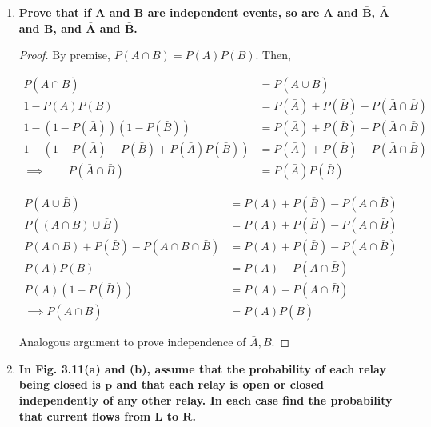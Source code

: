 \documentclass[10pt, oneside]{article}   	%
\theoremstyle{definition}
\begin{document}
\begin{enumerate}[label=3.\arabic*]
\item  \begin{tcolorbox}[
  colback=Cerulean!5!white,
  colframe=Cerulean!75!black]
\textbf{Prove that if $\bm{A}$ and $\bm{B}$ are independent events, so are $\bm{A}$ and $\bm{\bar{B}}$, $\bm{\bar{A}}$ and $\bm{B}$, and $\bm{\bar{A}}$ and $\bm{\bar{B}}$.}
\end{tcolorbox}

\begin{proof}
By premise, $P(A \cap B) = P(A)P(B)$. Then,

\begin{align*}
P(\overline{A \cap B}) &= P(\bar{A} \cup \bar{B}) \\
1 - P(A) P(B)  &= P(\bar{A}) + P(\bar{B}) - P(\bar{A} \cap \bar{B}) \\
1 - (1 - P(\bar{A}))(1 - P(\bar{B})) &= P(\bar{A}) + P(\bar{B}) - P(\bar{A} \cap \bar{B}) \\
1 - (1 - P(\bar{A}) - P(\bar{B}) + P(\bar{A})P(\bar{B})) &= P(\bar{A}) + P(\bar{B}) - P(\bar{A} \cap \bar{B}) \\
\implies \qquad P(\bar{A} \cap \bar{B}) &= P(\bar{A})P(\bar{B})
\end{align*}

\begin{align*}
P(A \cup \bar{B}) &= P(A) + P(\bar{B}) - P(A \cap \bar{B}) \\
P((A \cap B) \cup \bar{B}) &= P(A) + P(\bar{B}) - P(A \cap \bar{B}) \\
P(A \cap B) + P(\bar{B}) - P(A \cap B \cap \bar{B}) &= P(A) + P(\bar{B}) - P(A \cap \bar{B}) \\
P(A)P(B) &= P(A) - P(A \cap \bar{B}) \\
P(A) (1 - P(\bar{B})) &= P(A) - P(A \cap \bar{B}) \\
\implies P(A \cap \bar{B}) &= P(A) P(\bar{B})
\end{align*}

Analogous argument to prove independence of $\bar{A}, B$.
\end{proof}

\item  \begin{tcolorbox}[
  colback=Cerulean!5!white,
  colframe=Cerulean!75!black]
\textbf{In Fig. 3.11(a) and (b), assume that the probability of each relay being closed is $\bm{p}$ and that each relay is open or closed independently of any other relay. In each case find the probability that current flows from $\bm{L}$ to $\bm{R}$.}
\end{tcolorbox}


\end{enumerate}
\end{document}
